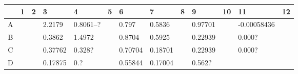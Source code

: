 \documentclass[UTF8,10pt,a4paper,fontset=fandol]{ctexart}
\newcommand{\fieldvalue}[1]{#1}
\begin{document}
\begin{center}
\scriptsize
\begin{tabular}{c|p{0.52cm}|p{0.52cm}|p{1.02cm}|p{1.02cm}|p{0.52cm}|p{1.02cm}|p{1.02cm}|p{0.52cm}|p{1.02cm}|p{0.52cm}|p{1.02cm}|p{0.52cm}}
 & 1 & 2 & 3 & 4 & 5 & 6 & 7 & 8 & 9 & 10 & 11 & 12\\ \hline
A & & &
\fieldvalue{\scriptsize 2.2179} &
\fieldvalue{\scriptsize 0.8061--?} &
&
\fieldvalue{\scriptsize 0.797} &
\fieldvalue{\scriptsize 0.5836} &
&
\fieldvalue{\scriptsize 0.97701} &
&
\fieldvalue{\scriptsize -0.00058436} &\\ \hline
B & & &
\fieldvalue{\scriptsize 0.3862} &
\fieldvalue{\scriptsize 1.4972} &
&
\fieldvalue{\scriptsize 0.8704} &
\fieldvalue{\scriptsize 0.5925} &
&
\fieldvalue{\scriptsize 0.22939} &
&
\fieldvalue{\scriptsize 0.000?} &\\ \hline
C & & &
\fieldvalue{\scriptsize 0.37762} &
\fieldvalue{\scriptsize 0.328?} &
&
\fieldvalue{\scriptsize 0.70704} &
\fieldvalue{\scriptsize 0.18701} &
&
\fieldvalue{\scriptsize 0.22939} &
&
\fieldvalue{\scriptsize 0.000?} &\\ \hline
D & & &
\fieldvalue{\scriptsize 0.17875} &
\fieldvalue{\scriptsize 0.?} &
&
\fieldvalue{\scriptsize 0.55844} &
\fieldvalue{\scriptsize 0.17004} &
&
\fieldvalue{\scriptsize 0.562?} &
&

\end{tabular}
\end{center}
\end{document}
